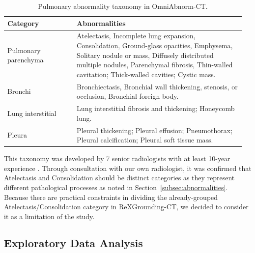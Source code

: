 \begin{table}
    \centering
    \caption{Pulmonary abnormality taxonomy in OmniAbnorm-CT.}
    \label{tab:omniabnorm-tax}
    \begin{tabular}{p{0.28\linewidth} p{0.68\linewidth}}
        \toprule
        \textbf{Category} & \textbf{Abnormalities} \\
        \midrule
        Pulmonary parenchyma &
        Atelectasis, Incomplete lung expansion, Consolidation, Ground-glass opacities, Emphysema, Solitary nodule or mass, Diffusely distributed multiple nodules, Parenchymal fibrosis, Thin-walled cavitation; Thick-walled cavities; Cystic mass. \\
        \addlinespace
        Bronchi &
        Bronchiectasis, Bronchial wall thickening, stenosis, or occlusion, Bronchial foreign body. \\
        \addlinespace
        Lung interstitial &
        Lung interstitial fibrosis and thickening; Honeycomb lung. \\
        \addlinespace
        Pleura &
        Pleural thickening; Pleural effusion; Pneumothorax; Pleural calcification; Pleural soft tissue mass. \\
        \bottomrule
    \end{tabular}
\end{table}

This taxonomy was developed by 7 senior radiologists with at least 10-year experience \cite{zhao2026rethinking}.
Through consultation with our own radiologist, it was confirmed that Atelectasis and Consolidation should be distinct categories
as they represent different pathological processes as noted in Section~\ref{subsec:abnormalities}.
Because there are practical constraints in dividing the already-grouped Atelectasis/Consolidation category in ReXGrounding-CT,
we decided to consider it as a limitation of the study.


\subsection{Exploratory Data Analysis}
\label{subsec:eda}

